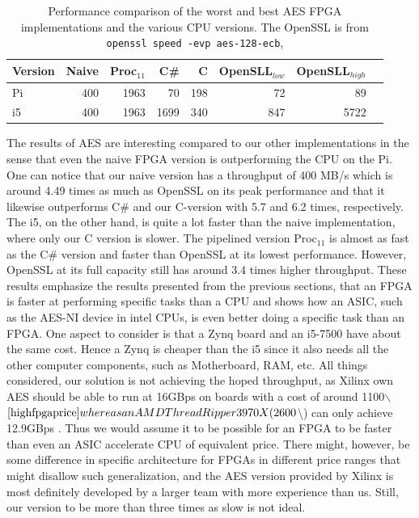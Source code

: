 \documentclass[a4paper, openany]{book}
\begin{document}
\begin{table}[H]
\centering
\captionsetup{width=.8\linewidth}
\begin{tabular}{l r r r r r r r}
\hline
\textbf{Version} & Naive & Proc$_{11}$ & C\# & C & OpenSLL$_{low}$ & OpenSLL$_{high}$\\
\hline
Pi & 400 & 1963 &    70& 198 & 72  & 89\\
i5 & 400 & 1963 & 1699 & 340 & 847 & 5722
\end{tabular}
\caption[AES: FPGA and CPU comparisons]%
{Performance comparison of the worst and best AES FPGA implementations and the various CPU versions. The OpenSSL is from \texttt{openssl speed -evp aes-128-ecb}, }
\label{tab:AEScompare}
\end{table}
The results of AES are interesting compared to our other implementations in the sense that even the naive FPGA version is outperforming the CPU on the Pi. One can notice that our naive version has a throughput of 400 MB/s which is around 4.49 times as much as OpenSSL on its peak performance and that it likewise outperforms C\# and our C-version with 5.7 and 6.2 times, respectively. The i5, on the other hand, is quite a lot faster than the naive implementation, where only our C version is slower. The pipelined version Proc\(_{11}\) is almost as fast as the C\# version and faster than OpenSSL at its lowest performance. However, OpenSSL at its full capacity still has around 3.4 times higher throughput. These results emphasize the results presented from the previous sections, that an FPGA is faster at performing specific tasks than a CPU and shows how an ASIC, such as the AES-NI device in intel CPUs, is even better doing a specific task than an FPGA. One aspect to consider is that a Zynq board and an i5-7500 have about the same cost\cite{pynq}\cite{i5price}. Hence a Zynq is cheaper than the i5 since it also needs all the other computer components, such as Motherboard, RAM, etc. All things considered, our solution is not achieving the hoped throughput, as Xilinx own AES\cite{aesxilinx} should be able to run at 16GBps on boards with a cost of around 1100$\backslash$$\cite{highfpgaprice} whereas an AMD ThreadRipper 3970X (2600$\backslash$$\cite{threadPrice}) can only achieve 12.9GBps \cite{threadripper}. Thus we would assume it to be possible for an FPGA to be faster than even an ASIC accelerate CPU of equivalent price. There might, however, be some difference in specific architecture for FPGAs in different price ranges that might disallow such generalization, and the AES version provided by Xilinx is most definitely developed by a larger team with more experience than us. Still, our version to be more than three times as slow is not ideal.
\end{document}
